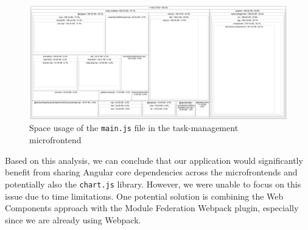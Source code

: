 \begin{figure}[h]
    \centerline{\includegraphics[width=1\textwidth]{images/task-space-usage.png}}
    \caption[Space usage of the task-management microfrontend]{Space usage of the \texttt{main.js} file in the task-management microfrontend}
    \label{fig:task-usage} 
\end{figure}
\noindent
Based on this analysis, we can conclude that our application would significantly benefit from sharing Angular core dependencies across the microfrontends and potentially also the \texttt{chart.js} library. However, we were unable to focus on this issue due to time limitations. One potential solution is combining the Web Components approach with the Module Federation Webpack plugin, especially since we are already using Webpack.